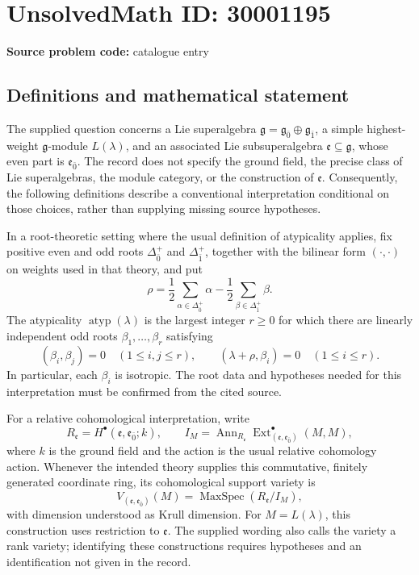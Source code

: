 \documentclass[11pt]{article}
\begin{document}
\section*{UnsolvedMath ID: 30001195}
\textbf{Source problem code:} catalogue entry
\subsection{Definitions and mathematical statement}
The supplied question concerns a Lie superalgebra \(\mathfrak g=\mathfrak g_{\bar 0}\oplus\mathfrak g_{\bar 1}\), a simple highest-weight \(\mathfrak g\)-module \(L(\lambda)\), and an associated Lie subsuperalgebra \(\mathfrak e\subseteq\mathfrak g\), whose even part is \(\mathfrak e_{\bar 0}\). The record does not specify the ground field, the precise class of Lie superalgebras, the module category, or the construction of \(\mathfrak e\). Consequently, the following definitions describe a conventional interpretation conditional on those choices, rather than supplying missing source hypotheses.

In a root-theoretic setting where the usual definition of atypicality applies, fix positive even and odd roots \(\Delta_{\bar 0}^{+}\) and \(\Delta_{\bar 1}^{+}\), together with the bilinear form \((\cdot,\cdot)\) on weights used in that theory, and put
\[
\rho=\frac12\sum_{\alpha\in\Delta_{\bar 0}^{+}}\alpha-\frac12\sum_{\beta\in\Delta_{\bar 1}^{+}}\beta.
\]
The atypicality \(\operatorname{atyp}(\lambda)\) is the largest integer \(r\geq 0\) for which there are linearly independent odd roots \(\beta_1,\ldots,\beta_r\) satisfying
\[
(\beta_i,\beta_j)=0\quad(1\leq i,j\leq r),
\qquad
(\lambda+\rho,\beta_i)=0\quad(1\leq i\leq r).
\]
In particular, each \(\beta_i\) is isotropic. The root data and hypotheses needed for this interpretation must be confirmed from the cited source.

For a relative cohomological interpretation, write
\[
R_{\mathfrak e}=H^{\bullet}(\mathfrak e,\mathfrak e_{\bar 0};k),
\qquad
I_M=\operatorname{Ann}_{R_{\mathfrak e}}
\operatorname{Ext}^{\bullet}_{(\mathfrak e,\mathfrak e_{\bar 0})}(M,M),
\]
where \(k\) is the ground field and the action is the usual relative cohomology action. Whenever the intended theory supplies this commutative, finitely generated coordinate ring, its cohomological support variety is
\[
V_{(\mathfrak e,\mathfrak e_{\bar 0})}(M)
=\operatorname{MaxSpec}(R_{\mathfrak e}/I_M),
\]
with dimension understood as Krull dimension. For \(M=L(\lambda)\), this construction uses restriction to \(\mathfrak e\). The supplied wording also calls the variety a rank variety; identifying these constructions requires hypotheses and an identification not given in the record.
\end{document}
